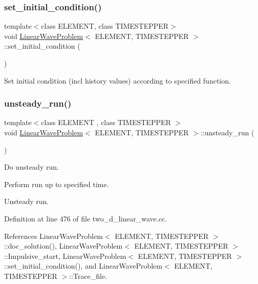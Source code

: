 \subsubsection{\texorpdfstring{set\+\_\+initial\+\_\+condition()}{set\_initial\_condition()}\hspace{0.1cm}{\footnotesize\ttfamily [2/2]}}
{\footnotesize\ttfamily template$<$class E\+L\+E\+M\+E\+NT, class T\+I\+M\+E\+S\+T\+E\+P\+P\+ER$>$ \\
void \hyperlink{classLinearWaveProblem}{Linear\+Wave\+Problem}$<$ E\+L\+E\+M\+E\+NT, T\+I\+M\+E\+S\+T\+E\+P\+P\+ER $>$\+::set\+\_\+initial\+\_\+condition (\begin{DoxyParamCaption}{ }\end{DoxyParamCaption})}



Set initial condition (incl history values) according to specified function. 

\mbox{\label{classLinearWaveProblem_a9993365201bfffcc04dd2034f0d3d391}} 
\subsubsection{\texorpdfstring{unsteady\+\_\+run()}{unsteady\_run()}\hspace{0.1cm}{\footnotesize\ttfamily [1/2]}}
{\footnotesize\ttfamily template$<$class E\+L\+E\+M\+E\+NT , class T\+I\+M\+E\+S\+T\+E\+P\+P\+ER $>$ \\
void \hyperlink{classLinearWaveProblem}{Linear\+Wave\+Problem}$<$ E\+L\+E\+M\+E\+NT, T\+I\+M\+E\+S\+T\+E\+P\+P\+ER $>$\+::unsteady\+\_\+run (\begin{DoxyParamCaption}{ }\end{DoxyParamCaption})}



Do unsteady run. 

Perform run up to specified time.

Unsteady run. 

Definition at line 476 of file two\+\_\+d\+\_\+linear\+\_\+wave.\+cc.



References Linear\+Wave\+Problem$<$ E\+L\+E\+M\+E\+N\+T, T\+I\+M\+E\+S\+T\+E\+P\+P\+E\+R $>$\+::doc\+\_\+solution(), Linear\+Wave\+Problem$<$ E\+L\+E\+M\+E\+N\+T, T\+I\+M\+E\+S\+T\+E\+P\+P\+E\+R $>$\+::\+Impulsive\+\_\+start, Linear\+Wave\+Problem$<$ E\+L\+E\+M\+E\+N\+T, T\+I\+M\+E\+S\+T\+E\+P\+P\+E\+R $>$\+::set\+\_\+initial\+\_\+condition(), and Linear\+Wave\+Problem$<$ E\+L\+E\+M\+E\+N\+T, T\+I\+M\+E\+S\+T\+E\+P\+P\+E\+R $>$\+::\+Trace\+\_\+file.



